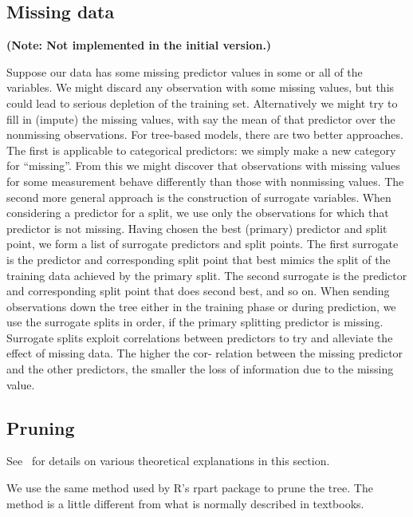 \subsection{Missing data} %
\label{sub:missing_predictor_data}
\textbf{(Note: Not implemented in the initial version.)}

Suppose our data has some missing predictor values in some or all of the
variables. We might discard any observation with some missing values, but this
could lead to serious depletion of the training set. Alternatively we might try
to fill in (impute) the missing values, with say the mean of that predictor over
the nonmissing observations. For tree-based models, there are two better
approaches. The first is applicable to categorical predictors: we simply make a
new category for ``missing''. From this we might discover that observations with
missing values for some measurement behave differently than those with
non\-missing values. The second more general approach is the construction of
surrogate variables. When considering a predictor for a split, we use only the
observations for which that predictor is not missing. Having chosen the best
(primary) predictor and split point, we form a list of surrogate predictors and
split points. The first surrogate is the predictor and corresponding split point
that best mimics the split of the training data achieved by the primary split.
The second surrogate is the predictor and corresponding split point that does
second best, and so on. When sending observations down the tree either in the
training phase or during prediction, we use the surrogate splits in order, if
the primary splitting predictor is missing. Surrogate splits exploit
correlations between predictors to try and alleviate the effect of missing data.
The higher the cor- relation between the missing predictor and the other
predictors, the smaller the loss of information due to the missing value.


\subsection{Pruning} %
\label{sub:pruning}

See~\cite{hastie2008statisticallearning} for details on various
theoretical explanations in this section.

We use the same method used by R's rpart package to prune the tree.
The method is a little different from what is normally described in
textbooks.

